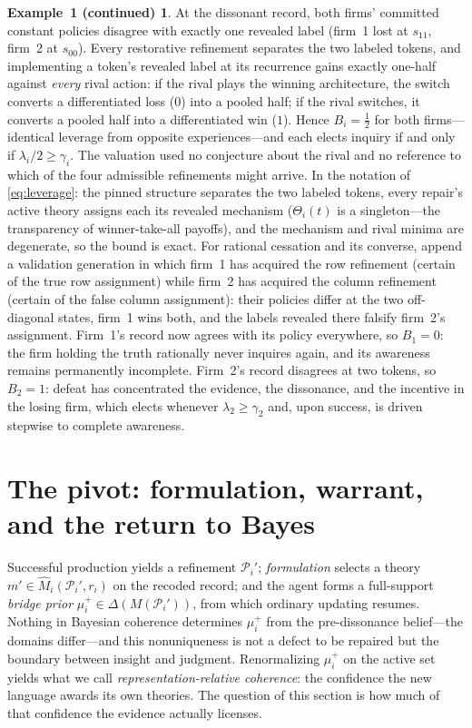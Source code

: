 \documentclass[11pt]{article}
\theoremstyle{definition}
\newtheorem*{excont}{Example~1 (continued)}
\begin{document}
\begin{excont}
At the dissonant record, both firms' committed constant policies disagree
with exactly one revealed label (firm~1 lost at $s_{11}$, firm~2 at
$s_{00}$).  Every restorative refinement separates the two labeled tokens,
and implementing a token's revealed label at its recurrence gains exactly
one-half against \emph{every} rival action: if the rival plays the winning
architecture, the switch converts a differentiated loss ($0$) into a pooled
half; if the rival switches, it converts a pooled half into a differentiated
win ($1$).  Hence $B_i=\tfrac12$ for both firms---identical leverage from
opposite experiences---and each elects inquiry if and only if
$\lambda_i/2\geq\gamma_i$.  The valuation used no conjecture about the
rival and no reference to which of the four admissible refinements might
arrive.  In the notation of \cref{eq:leverage}: the pinned structure
separates the two labeled tokens, every repair's active theory assigns each
its revealed mechanism ($\Theta_i(t)$ is a singleton---the transparency of
winner-take-all payoffs), and the mechanism and rival minima are degenerate,
so the bound is exact.  For rational cessation and its converse, append a validation
generation in which firm~1 has acquired the row refinement (certain of the
true row assignment) while firm~2 has acquired the column refinement
(certain of the false column assignment): their policies differ at the two
off-diagonal states, firm~1 wins both, and the labels revealed there
falsify firm~2's assignment.  Firm~1's record now agrees with its policy
everywhere, so $B_1=0$: the firm holding the truth rationally never
inquires again, and its awareness remains permanently incomplete.  Firm~2's
record disagrees at two tokens, so $B_2=1$: defeat has concentrated the
evidence, the dissonance, and the incentive in the losing firm, which
elects whenever $\lambda_2\geq\gamma_2$ and, upon success, is driven
stepwise to complete awareness.
\end{excont}
\section{The pivot: formulation, warrant, and the return to Bayes}
\label{sec:pivot}

Successful production yields a refinement $\mathcal P_i'$; \emph{formulation}
selects a theory $m'\in\widehat M_i(\mathcal P_i',r_i)$ on the recoded
record; and the agent forms a full-support \emph{bridge prior}
$\mu_i^{+}\in\Delta(M(\mathcal P_i'))$, from which ordinary updating
resumes.  Nothing in Bayesian coherence determines $\mu_i^{+}$ from the
pre-dissonance belief---the domains differ---and this nonuniqueness is not a
defect to be repaired but the boundary between insight and judgment.
Renormalizing $\mu_i^{+}$ on the active set yields what we call
\emph{representation-relative coherence}: the confidence the new language
awards its own theories.  The question of this section is how much of that
confidence the evidence actually licenses.
\end{document}
